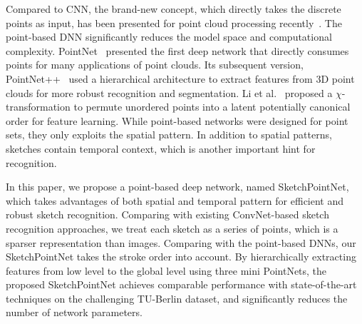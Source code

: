  Compared to CNN, the brand-new concept, which directly takes the discrete points as input, has been presented for point cloud processing recently~\cite{qi2017pointnet, qi2017pointnetplusplus, 1801.07791}.
The point-based DNN significantly reduces the model space and computational complexity.
%
PointNet~\cite{qi2017pointnet} presented the first deep network that directly consumes points for many applications of point clouds.
Its subsequent version, PointNet++~\cite{qi2017pointnetplusplus} used a hierarchical architecture to extract features from 3D point clouds for more robust recognition and segmentation.
%
Li et al.~\cite{1801.07791} proposed a $\chi$-transformation to permute unordered points into a latent potentially canonical order for feature learning.
While point-based networks were designed for point sets, they only exploits the spatial pattern.
In addition to spatial patterns, sketches contain temporal context, which is another important hint for recognition.



In this paper, we propose a point-based deep network, named SketchPointNet, which takes advantages of both spatial and temporal pattern for efficient and robust sketch recognition.
%
Comparing with existing ConvNet-based sketch recognition approaches, we treat each sketch as a series of points, which is a sparser representation than images.
Comparing with the point-based DNNs, our SketchPointNet takes the stroke order into account.
%
By hierarchically extracting features from low level to the global level using three mini PointNets, the proposed SketchPointNet achieves comparable performance with state-of-the-art techniques on the challenging TU-Berlin dataset, and significantly reduces the number of network parameters.

